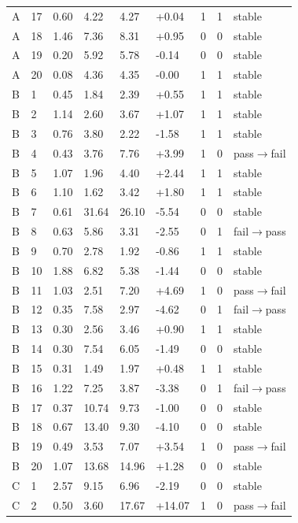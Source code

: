 \documentclass[11pt,a4paper]{article}
\begin{document}
\begin{landscape}
{\begin{longtable}[]{@{}lllllllll@{}}
A & 17 & 0.60 & 4.22 & 4.27 & +0.04 & 1 & 1 & stable \\
A & 18 & 1.46 & 7.36 & 8.31 & +0.95 & 0 & 0 & stable \\
A & 19 & 0.20 & 5.92 & 5.78 & -0.14 & 0 & 0 & stable \\
A & 20 & 0.08 & 4.36 & 4.35 & -0.00 & 1 & 1 & stable \\
B & 1 & 0.45 & 1.84 & 2.39 & +0.55 & 1 & 1 & stable \\
B & 2 & 1.14 & 2.60 & 3.67 & +1.07 & 1 & 1 & stable \\
B & 3 & 0.76 & 3.80 & 2.22 & -1.58 & 1 & 1 & stable \\
B & 4 & 0.43 & 3.76 & 7.76 & +3.99 & 1 & 0 & pass\ensuremath{\rightarrow}fail \\
B & 5 & 1.07 & 1.96 & 4.40 & +2.44 & 1 & 1 & stable \\
B & 6 & 1.10 & 1.62 & 3.42 & +1.80 & 1 & 1 & stable \\
B & 7 & 0.61 & 31.64 & 26.10 & -5.54 & 0 & 0 & stable \\
B & 8 & 0.63 & 5.86 & 3.31 & -2.55 & 0 & 1 & fail\ensuremath{\rightarrow}pass \\
B & 9 & 0.70 & 2.78 & 1.92 & -0.86 & 1 & 1 & stable \\
B & 10 & 1.88 & 6.82 & 5.38 & -1.44 & 0 & 0 & stable \\
B & 11 & 1.03 & 2.51 & 7.20 & +4.69 & 1 & 0 & pass\ensuremath{\rightarrow}fail \\
B & 12 & 0.35 & 7.58 & 2.97 & -4.62 & 0 & 1 & fail\ensuremath{\rightarrow}pass \\
B & 13 & 0.30 & 2.56 & 3.46 & +0.90 & 1 & 1 & stable \\
B & 14 & 0.30 & 7.54 & 6.05 & -1.49 & 0 & 0 & stable \\
B & 15 & 0.31 & 1.49 & 1.97 & +0.48 & 1 & 1 & stable \\
B & 16 & 1.22 & 7.25 & 3.87 & -3.38 & 0 & 1 & fail\ensuremath{\rightarrow}pass \\
B & 17 & 0.37 & 10.74 & 9.73 & -1.00 & 0 & 0 & stable \\
B & 18 & 0.67 & 13.40 & 9.30 & -4.10 & 0 & 0 & stable \\
B & 19 & 0.49 & 3.53 & 7.07 & +3.54 & 1 & 0 & pass\ensuremath{\rightarrow}fail \\
B & 20 & 1.07 & 13.68 & 14.96 & +1.28 & 0 & 0 & stable \\
C & 1 & 2.57 & 9.15 & 6.96 & -2.19 & 0 & 0 & stable \\
C & 2 & 0.50 & 3.60 & 17.67 & +14.07 & 1 & 0 & pass\ensuremath{\rightarrow}fail \\

\end{longtable}}
\end{landscape}
\end{document}
